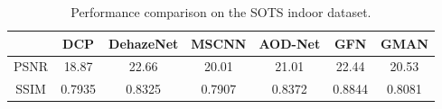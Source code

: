 \documentclass[journal]{IEEEtran}
\begin{document}
\begin{table}[!htbp]
	\centering
	\caption{Performance comparison on the SOTS indoor dataset.}
	\begin{tabular}{ccccccc}
	\hline
		&DCP &DehazeNet &MSCNN &AOD-Net &GFN &GMAN\\ \hline
		PSNR &18.87 &22.66 &20.01 &21.01 &22.44 &20.53\\
		SSIM &0.7935 &0.8325 &0.7907 &0.8372 &0.8844 &0.8081\\ \hline
	\end{tabular}
	\label{t.2}
\end{table}


%
%

\end{document}
